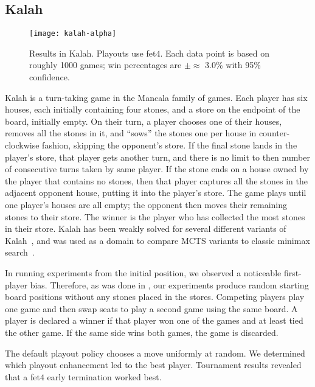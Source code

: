 \documentclass{article}
\begin{document}
\subsection{Kalah}

\begin{figure}
\begin{center}
\texttt{[image: kalah-alpha]}
\caption{Results in Kalah. Playouts use fet$4$. Each data point is based on roughly 1000 
games; win percentages are $\pm \approx$ 3.0\% with 95\% confidence.}
\label{fig:kalah-alpha}
\end{center}
\end{figure}

Kalah is a turn-taking game in the Mancala family of games. Each player has six houses, each 
initially containing four stones, and a store on the endpoint of the board, initially empty. 
On their turn, a player chooses one of their houses, removes all the stones in it, and ``sows'' 
the stones one per house in counter-clockwise fashion, skipping the opponent's store. 
If the final stone lands in the player's store, that player gets another turn, and there is no 
limit to then number of consecutive turns taken by same player. If the stone ends on a house owned
by the player that contains no stones, then that player captures all the stones in the adjacent 
opponent house, putting it into the player's store. The game plays until one player's houses are
all empty; the opponent then moves their remaining stones to their store. The winner is the player
who has collected the most stones in their store. 
Kalah has been weakly solved for several different variants of Kalah~\cite{Irving00Solving}, 
and was used as a domain to compare MCTS variants to classic minimax search~\cite{Ramanujan11Tradeoffs}.

In running experiments from the initial position, we observed a noticeable first-player bias. Therefore, as
was done in \cite{Ramanujan11Tradeoffs}, our experiments produce random starting board positions 
without any stones placed in the stores. 
Competing players play one game and then swap seats to play a second game using the same board. A player 
is declared a winner if that player won one of the games and at least tied the other game. If the same side 
wins both games, the game is discarded. 

The default playout policy chooses a move uniformly at random. 
We determined which playout enhancement led to the best player. 
Tournament results revealed that a fet$4$ early termination worked best. 
\end{document}
